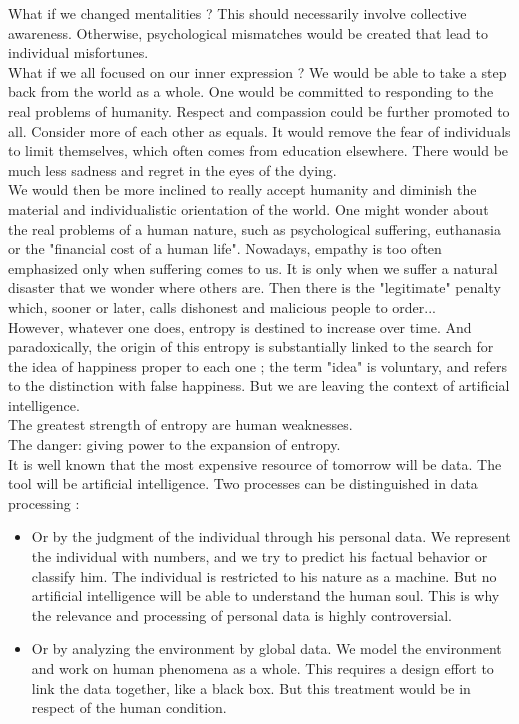 What if we changed mentalities ? This should necessarily involve collective awareness. Otherwise, psychological mismatches would be created that lead to individual misfortunes.\\

What if we all focused on our inner expression ? We would be able to take a step back from the world as a whole. One would be committed to responding to the real problems of humanity. Respect and compassion could be further promoted to all. Consider more of each other as equals. It would remove the fear of individuals to limit themselves, which often comes from education elsewhere. There would be much less sadness and regret in the eyes of the dying.\\

We would then be more inclined to really accept humanity and diminish the material and individualistic orientation of the world. One might wonder about the real problems of a human nature, such as psychological suffering, euthanasia or the "financial cost of a human life". Nowadays, empathy is too often emphasized only when suffering comes to us. It is only when we suffer a natural disaster that we wonder where others are. Then there is the "legitimate" penalty which, sooner or later, calls dishonest and malicious people to order...\\

However, whatever one does, entropy is destined to increase over time. And paradoxically, the origin of this entropy is substantially linked to the search for the idea of happiness proper to each one ; the term "idea" is voluntary, and refers to the distinction with false happiness. But we are leaving the context of artificial intelligence.\\

The greatest strength of entropy are human weaknesses.\\
The danger: giving power to the expansion of entropy.\\

It is well known that the most expensive resource of tomorrow will be data. The tool will be artificial intelligence. Two processes can be distinguished in data processing :\\
\begin{itemize}
\item Or by the judgment of the individual through his personal data. We represent the individual with numbers, and we try to predict his factual behavior or classify him. The individual is restricted to his nature as a machine. But no artificial intelligence will be able to understand the human soul. This is why the relevance and processing of personal data is highly controversial.
\item Or by analyzing the environment by global data. We model the environment and work on human phenomena as a whole. This requires a design effort to link the data together, like a black box. But this treatment would be in respect of the human condition.\\
\end{itemize}

